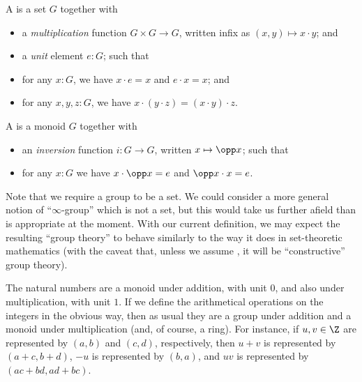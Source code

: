 %

\begin{defn}
  A 
  is a set $G$ together with
  \begin{itemize}
  \item a \emph{multiplication}
    function $G\times G\to G$, written infix as $(x,y) \mapsto x\cdot y$; and
  \item a \emph{unit}
    element $e:G$; such that
  \item for any $x:G$, we have $x\cdot e = x$ and $e\cdot x = x$; and
  \item for any $x,y,z:G$, we have $x\cdot (y\cdot z) = (x\cdot y)\cdot z$.
  \end{itemize}
  A 
  is a monoid $G$ together with
  \begin{itemize}
  \item an \emph{inversion} function $i:G\to G$, written $x\mapsto \opp x$; such that
  \item for any $x:G$ we have $x\cdot \opp x = e$ and $\opp x \cdot x = e$.
  \end{itemize}
\end{defn}

\begin{rmk}\label{rmk:infty-group}
Note that we require a group to be a set.
We could consider a more general notion of ``$\infty$-group''%
which is not a set, but this would take us further afield than is appropriate at the moment.
With our current definition, we may expect the resulting ``group theory'' to behave similarly to the way it does in set-theoretic mathematics (with the caveat that, unless we assume \LEM{}, it will be ``constructive'' group theory).
\end{rmk}

\begin{eg}
  The natural numbers \N are a monoid under addition, with unit $0$, and also under multiplication, with unit $1$.
  If we define the arithmetical operations on the integers \Z in the obvious way, then as usual they are a group under addition and a monoid under multiplication (and, of course, a ring).
  For instance, if $u, v \in \Z$ are represented by $(a,b)$ and $(c,d)$, respectively, then $u + v$ is represented by $(a + c, b + d)$, $-u$ is represented by $(b, a)$, and $u v$ is represented by $(a c + b d, a d + b c)$.
\end{eg}

